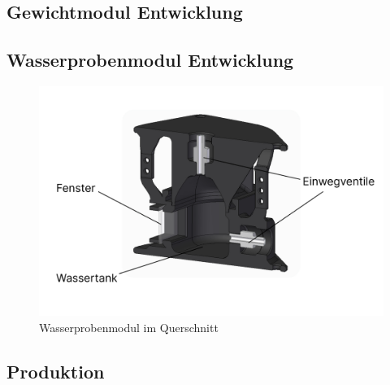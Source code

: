 \documentclass[11pt]{article}
\begin{document}
\endgroup

\subsection{Gewichtmodul Entwicklung}
\Gewichtmodul

\newpage
\subsection{Wasserprobenmodul Entwicklung}
\begingroup
\begin{figure}
\centering
  \includegraphics[width=\linewidth]{Wasserprobenmodul.jpg}
  \caption{Wasserprobenmodul im Querschnitt}
\end{figure}
\Wasserprobenmodul

\endgroup

\subsection{Produktion}
\Produktion

\end{document}

